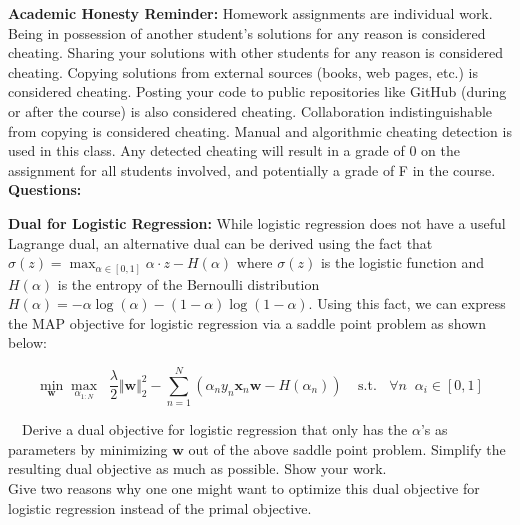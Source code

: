 \documentclass[11pt]{article}
\newcommand{\mbf}[1]{{\mathbf{#1}}}
\begin{document}
\textbf{Academic Honesty Reminder:} Homework assignments are individual work. Being in possession of another student's solutions for any reason is considered cheating. Sharing your solutions with other students for any reason is considered cheating. Copying solutions from external sources (books, web pages, etc.) is considered cheating. Posting your code to public repositories like GitHub (during or after the course) is also considered cheating. Collaboration indistinguishable from copying is considered cheating. Manual and algorithmic cheating detection is used in this class. Any detected cheating will result in a grade of 0 on the assignment for all students involved, and potentially a grade of F in the course.  
\\

\textbf{Questions:}

\begin{problem}{20} \textbf{Dual for Logistic Regression:} While logistic regression does not have a useful Lagrange dual, an alternative dual can be derived using the fact that $\sigma(z) = \max_{\alpha\in[0,1]} \alpha\cdot z - H(\alpha)$ where $\sigma(z)$ is the logistic function and $H(\alpha)$ is the entropy of the Bernoulli distribution $H(\alpha) = -\alpha\log(\alpha) - (1-\alpha)\log(1-\alpha)$. Using this fact, we can express the MAP objective for logistic regression via a saddle point problem as shown below:
	
$$\min_{\mbf{w}}\max_{\alpha_{1:N}}\;\; \frac{\lambda}{2}\Vert \mbf{w}\Vert_2^2-\sum_{n=1}^N\left(\alpha_n y_n \mbf{x}_n \mbf{w} - H(\alpha_n)\right) \;\;\;\; \mbox{s.t. }\;\;\forall n \;\; \alpha_i \in [0,1]$$
	
~~Derive a dual objective for logistic regression that only has the $\alpha$'s as parameters by minimizing $\mbf{w}$ out of the above saddle point problem. Simplify the resulting dual objective as much as possible. Show your work. \\

 Give two reasons why one one might want to optimize this dual objective for logistic regression instead of the primal objective.

\end{problem}
\end{document}

